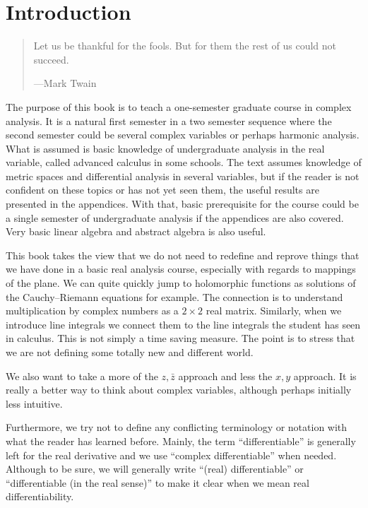 \documentclass[12pt,openany]{book}
\theoremstyle{plain}
\theoremstyle{remark}
\theoremstyle{definition}
\newenvironment{myquote}{%
    \begin{quote}%
    \begingroup\itshape
}{%
    \endgroup%
    \end{quote}
}
\theoremstyle{exercise}
\theoremstyle{example}
\begin{document}
\chapter*{Introduction} \label{ch:intro}

\begin{myquote}
Let us be thankful for the fools. But for them the rest of us could not succeed.

---Mark Twain 
\end{myquote}

The purpose of this book is to teach a one-semester graduate course in
complex analysis.
It is a natural first semester in a two semester sequence where the second
semester could be several complex variables or perhaps harmonic analysis.
What is assumed is basic knowledge of undergraduate
analysis in the real variable, called advanced calculus in some schools.
The text assumes knowledge of metric spaces
and differential analysis in several variables, but if the reader is not
confident on these topics or has not yet seen them, the useful results
are presented in the appendices.  With that, basic prerequisite for the
course could be a single semester of undergraduate analysis if the
appendices are also covered.  Very basic linear algebra and abstract algebra
is also useful.

This book takes the view that we do not need to redefine and reprove
things that we have done in a basic real analysis course, especially with
regards to mappings of the plane.  We can quite quickly jump to
holomorphic functions as solutions of the Cauchy--Riemann equations for
example.
The connection is to understand multiplication by complex numbers
as a $2 \times 2$ real matrix.
Similarly, when we introduce line integrals we connect
them to the line integrals the student has seen in calculus.
This is not simply a time saving measure.
The point is to stress that we are not defining some totally new and different world.

We also want to take a more of the $z,\bar{z}$ approach and less the
$x,y$ approach.  It is really a better way to think about complex variables,
although perhaps initially less intuitive.

Furthermore, we try not to define any conflicting terminology or notation
with what the reader has learned before.
Mainly, the term ``differentiable'' is generally left for the real
derivative and we use ``complex differentiable'' when needed.  Although
to be sure, 
we will generally write ``(real) differentiable'' or
``differentiable (in the real sense)'' to
make it clear when we mean real differentiability.
\end{document}
